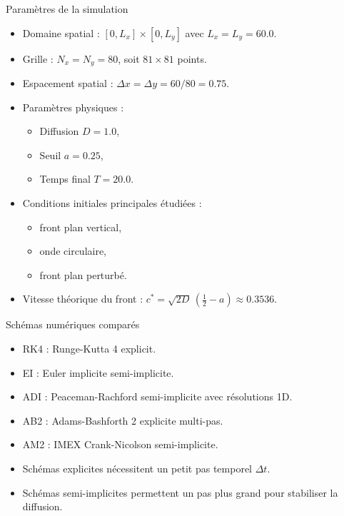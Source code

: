 \documentclass[10pt]{beamer}
\begin{document}
\begin{frame}{Paramètres de la simulation}
  \begin{itemize}
    \item Domaine spatial : $[0,L_x]\times[0,L_y]$ avec $L_x = L_y = 60.0$.
    \item Grille : $N_x = N_y = 80$, soit $81\times81$ points.
    \item Espacement spatial : $\Delta x = \Delta y = 60/80 = 0.75$.
    \item Paramètres physiques :
      \begin{itemize}
        \item Diffusion $D = 1.0$,
        \item Seuil $a = 0.25$,
        \item Temps final $T = 20.0$.
      \end{itemize}
    \item Conditions initiales principales étudiées :
      \begin{itemize}
        \item front plan vertical,
        \item onde circulaire,
        \item front plan perturbé.
      \end{itemize}
    \item Vitesse théorique du front :
      $c^* = \sqrt{2D}\,(\tfrac12 - a) \approx 0.3536$.
  \end{itemize}
\end{frame}

\begin{frame}{Schémas numériques comparés}
  \begin{itemize}
    \item RK4 : Runge-Kutta 4 explicit.
    \item EI : Euler implicite semi-implicite.
    \item ADI : Peaceman-Rachford semi-implicite avec résolutions 1D.
    \item AB2 : Adams-Bashforth 2 explicite multi-pas.
    \item AM2 : IMEX Crank-Nicolson semi-implicite.
  \end{itemize}
  \begin{itemize}
    \item Schémas explicites nécessitent un petit pas temporel $\Delta t$.
    \item Schémas semi-implicites permettent un pas plus grand pour stabiliser la diffusion.
  \end{itemize}
\end{frame}
\end{document}

